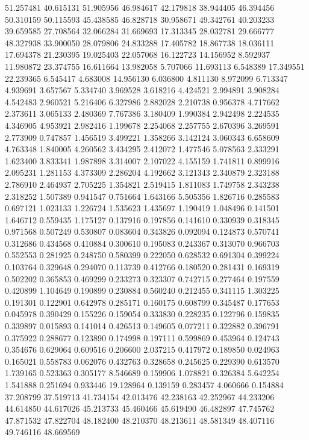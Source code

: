 51.257481
40.615131
51.905956
46.984617
42.179818
38.944405
46.394456
50.310159
50.115593
45.438585
46.828718
30.958671
49.342761
40.203233
39.659585
27.708564
32.066284
31.669693
17.313345
28.032781
29.666777
48.327938
33.900050
28.079806
24.833288
17.405782
18.867738
18.036111
17.694378
21.230395
19.025403
22.057068
16.122723
14.156952
8.592937
11.980872
23.374755
16.611664
13.982058
5.707066
11.693113
6.548389
17.349551
22.239365
6.545417
4.683008
14.956130
6.036800
4.811130
8.972099
6.713347
4.939691
3.657567
5.334740
3.969528
3.618216
4.424521
2.994891
3.908284
4.542483
2.960521
5.216406
6.327986
2.882028
2.210738
0.956378
4.717662
2.373611
3.065133
2.480369
7.767386
3.180409
1.990384
2.942498
2.224535
4.346905
4.953921
2.982416
1.199678
2.254068
2.257755
2.670396
3.269591
2.773909
0.747857
1.456519
3.499221
1.358266
3.142124
3.060343
6.658609
4.763348
1.840005
4.260562
3.434295
2.412072
1.477546
5.078563
2.333291
1.623400
3.833341
1.987898
3.314007
2.107022
4.155159
1.741811
0.899916
2.095231
1.281153
4.373309
2.286204
4.192662
3.121343
2.340879
2.323188
2.786910
2.464937
2.705225
1.354821
2.519415
1.811083
1.749758
2.343238
2.318252
1.507389
0.941547
0.751664
1.643166
5.505356
1.826716
0.285583
0.697121
1.023133
1.226724
1.535623
1.435697
1.190419
1.048496
0.141501
1.646712
0.559435
1.175127
0.137916
0.197856
0.141610
0.330939
0.318345
0.971568
0.507249
0.530807
0.083604
0.343826
0.092094
0.124873
0.570741
0.312686
0.434568
0.410884
0.300610
0.195083
0.243367
0.313070
0.966703
0.552553
0.281925
0.248750
0.580399
0.222050
0.628532
0.691304
0.399224
0.103764
0.329648
0.294070
0.113739
0.412766
0.180520
0.281431
0.169319
0.502202
0.365853
0.469299
0.233273
0.323307
0.742715
0.277464
0.197559
0.420899
1.104649
0.190899
0.230884
0.560240
0.212455
0.341115
1.303225
0.191301
0.122901
0.642978
0.285171
0.160175
0.608799
0.345487
0.177653
0.045978
0.390429
0.155226
0.159054
0.333830
0.228235
0.122796
0.159835
0.339897
0.015893
0.141014
0.426513
0.149605
0.077211
0.322882
0.396791
0.375922
0.288677
0.123890
0.174998
0.197111
0.599869
0.453964
0.124743
0.354676
0.629064
0.609516
0.206600
2.037215
0.417972
0.189850
0.024963
0.165021
0.558783
0.062076
0.432763
0.328658
0.245625
0.229390
0.613570
1.739165
0.523363
0.305177
8.546689
0.159906
1.078821
0.326384
5.642254
1.541888
0.251694
0.933446
19.128964
0.139159
0.283457
4.060666
0.154884
37.208799
37.519713
41.734154
42.013476
42.238163
42.252967
44.233206
44.614850
44.617026
45.213733
45.460466
45.619490
46.482897
47.745762
47.871532
47.822704
48.182400
48.210370
48.213611
48.581349
48.407116
49.746116
48.669569
